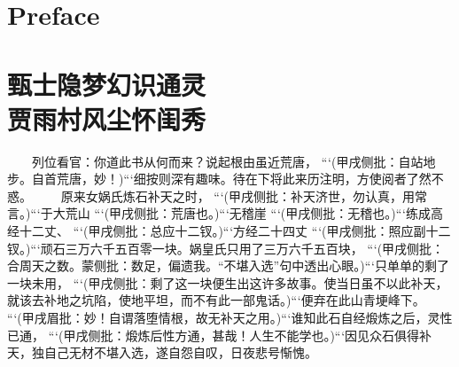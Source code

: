 \documentclass[
    ref = refDemo.bib,
    coverpage = cover.pdf,
    geometry = b5,
    lang = cn
]{spBook}
\date{\today}
\begin{document}
    \frontmatter
    \maketitle
    \tableofcontents
    \chapter{Preface}
    \lipsum[1-10]

    \mainmatter
    \chapter{甄士隐梦幻识通灵\\贾雨村风尘怀闺秀}
    　　列位看官：你道此书从何而来？说起根由虽近荒唐， ```(甲戌侧批：自站地步。自首荒唐，妙！)```细按则深有趣味。待在下将此来历注明，方使阅者了然不惑。  
    　　原来女娲氏炼石补天之时， ```(甲戌侧批：补天济世，勿认真，用常言。)```于大荒山 ```(甲戌侧批：荒唐也。)```无稽崖 ```(甲戌侧批：无稽也。)```练成高经十二丈、 ```(甲戌侧批：总应十二钗。)```方经二十四丈 ```(甲戌侧批：照应副十二钗。)```顽石三万六千五百零一块。娲皇氏只用了三万六千五百块， ```(甲戌侧批：合周天之数。蒙侧批：数足，偏遗我。“不堪入选”句中透出心眼。)```只单单的剩了一块未用， ```(甲戌侧批：剩了这一块便生出这许多故事。使当日虽不以此补天，就该去补地之坑陷，使地平坦，而不有此一部鬼话。)```便弃在此山青埂峰下。 ```(甲戌眉批：妙！自谓落堕情根，故无补天之用。)```谁知此石自经煅炼之后，灵性已通， ```(甲戌侧批：煅炼后性方通，甚哉！人生不能学也。)```因见众石俱得补天，独自己无材不堪入选，遂自怨自叹，日夜悲号惭愧。  
\end{document}
